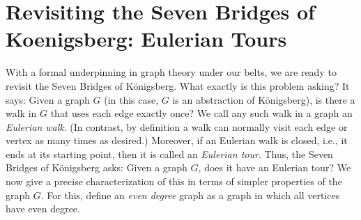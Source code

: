 \documentclass[11pt]{article}
\begin{document}
\section{Revisiting the Seven Bridges of Koenigsberg: Eulerian Tours}\label{scn:euler}

With a formal underpinning in graph theory under our belts, we are ready to revisit the Seven Bridges of K\"onigsberg. What exactly is this problem asking? It says: Given a graph $G$ (in this case, $G$ is an abstraction of K\"onigsberg), is there a walk in $G$ that uses each edge
exactly once? We call any such walk in a graph an \emph{Eulerian walk}. (In contrast, by definition a walk can normally visit each edge or vertex as many times as desired.) Moreover, if an Eulerian walk is closed, i.e., it ends at its starting point, then it is called an {\it Eulerian tour}. Thus, the  Seven Bridges of K\"onigsberg asks: Given a graph $G$, does it have an Eulerian tour? We now give a precise characterization of this in terms of simpler properties of the graph $G$. For this, define an \emph{even degree} graph as a graph in which all vertices have even degree. 
\end{document}
